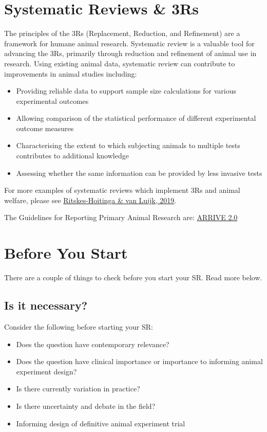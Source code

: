 \documentclass[
]{book}
\providecommand{\tightlist}{%
  \setlength{\itemsep}{0pt}\setlength{\parskip}{0pt}}
\begin{document}
\hypertarget{srs-3rs}{%
\chapter{Systematic Reviews \& 3Rs}\label{srs-3rs}}

The principles of the 3Rs (Replacement, Reduction, and Refinement) are a framework for humane animal research. Systematic review is a valuable tool for advancing the 3Rs, primarily through reduction and refinement of animal use in research. Using existing animal data, systematic review can contribute to improvements in animal studies including:

\begin{itemize}
\tightlist
\item
  Providing reliable data to support sample size calculations for various experimental outcomes
\item
  Allowing comparison of the statistical performance of different experimental outcome measures
\item
  Characterising the extent to which subjecting animals to multiple tests contributes to additional knowledge
\item
  Assessing whether the same information can be provided by less invasive tests
\end{itemize}

For more examples of systematic reviews which implement 3Rs and animal welfare, please see \href{https://www.mdpi.com/2076-2615/9/12/1163/htm}{Ritskes-Hoitinga \& van Luijk, 2019}.

The Guidelines for Reporting Primary Animal Research are: \href{https://journals.plos.org/plosbiology/article?id=10.1371/journal.pbio.3000410}{ARRIVE 2.0}

\hypertarget{b4ustart}{%
\chapter{Before You Start}\label{b4ustart}}

There are a couple of things to check before you start your SR. Read more below.

\hypertarget{is-it-necessary}{%
\section{Is it necessary?}\label{is-it-necessary}}

Consider the following before starting your SR:

\begin{itemize}
\tightlist
\item
  Does the question have contemporary relevance?
\item
  Does the question have clinical importance or importance to informing animal experiment design?
\item
  Is there currently variation in practice?
\item
  Is there uncertainty and debate in the field?
\item
  Informing design of definitive animal experiment trial
\end{itemize}
\end{document}
